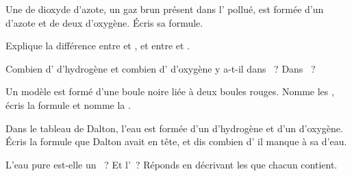 \begin{exercise}[$\star$]\label{exo:g7:atoms-and-molecules:5}
Une  de dioxyde d'azote, un gaz brun présent dans l' pollué,
est formée d'un  d'azote et de deux  d'oxygène. Écris sa
formule.
\end{exercise}

\begin{exercise}[$\star\star$]\label{exo:g7:atoms-and-molecules:6}
Explique la différence entre  et , et entre  et
.
\end{exercise}

\begin{exercise}[$\star\star$]\label{exo:g7:atoms-and-molecules:7}
Combien d' d'hydrogène et combien d' d'oxygène y a-t-il dans
~? Dans ~?
\end{exercise}

\begin{exercise}[$\star\star$]\label{exo:g7:atoms-and-molecules:8}
Un modèle est formé d'une boule noire liée à deux boules rouges. Nomme
les , écris la formule et nomme la .
\end{exercise}

\begin{exercise}[$\star\star$]\label{exo:g7:atoms-and-molecules:9}
Dans le tableau de Dalton, l'eau est formée d'un  d'hydrogène et
d'un  d'oxygène. Écris la formule que Dalton avait en tête, et dis
combien d' il manque à sa  d'eau.
\end{exercise}

\begin{exercise}[$\star\star$]\label{exo:g7:atoms-and-molecules:10}
L'eau pure est-elle un ~? Et l'~? Réponds en décrivant les
 que chacun contient.
\end{exercise}

